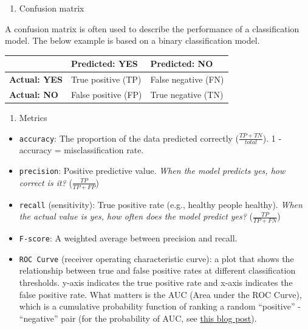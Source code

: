 \documentclass[
]{book}
\providecommand{\tightlist}{%
  \setlength{\itemsep}{0pt}\setlength{\parskip}{0pt}}
\begin{document}
\begin{enumerate}
\def\labelenumi{\arabic{enumi}.}
\tightlist
\item
  Confusion matrix
\end{enumerate}

A confusion matrix is often used to describe the performance of a classification model. The below example is based on a binary classification model.

\begin{longtable}[]{@{}lll@{}}
\toprule\noalign{}
& Predicted: YES & Predicted: NO \\
\midrule\noalign{}
\endhead
\bottomrule\noalign{}
\endlastfoot
\textbf{Actual: YES} & True positive (TP) & False negative (FN) \\
\textbf{Actual: NO} & False positive (FP) & True negative (TN) \\
\end{longtable}

\begin{enumerate}
\def\labelenumi{\arabic{enumi}.}
\setcounter{enumi}{1}
\tightlist
\item
  Metrics
\end{enumerate}

\begin{itemize}
\item
  \texttt{accuracy}: The proportion of the data predicted correctly (\(\frac{TP + TN}{total}\)). 1 - accuracy = misclassification rate.
\item
  \texttt{precision}: Positive predictive value. \emph{When the model predicts yes, how correct is it?} (\(\frac{TP}{TP + FP}\))
\item
  \texttt{recall} (sensitivity): True positive rate (e.g., healthy people healthy). \emph{When the actual value is yes, how often does the model predict yes?} (\(\frac{TP}{TP + FN}\))
\item
  \texttt{F-score}: A weighted average between precision and recall.
\item
  \texttt{ROC\ Curve} (receiver operating characteristic curve): a plot that shows the relationship between true and false positive rates at different classification thresholds. y-axis indicates the true positive rate and x-axis indicates the false positive rate. What matters is the AUC (Area under the ROC Curve), which is a cumulative probability function of ranking a random ``positive'' - ``negative'' pair (for the probability of AUC, see \href{https://www.alexejgossmann.com/auc/}{this blog post}).
\end{itemize}
\end{document}
